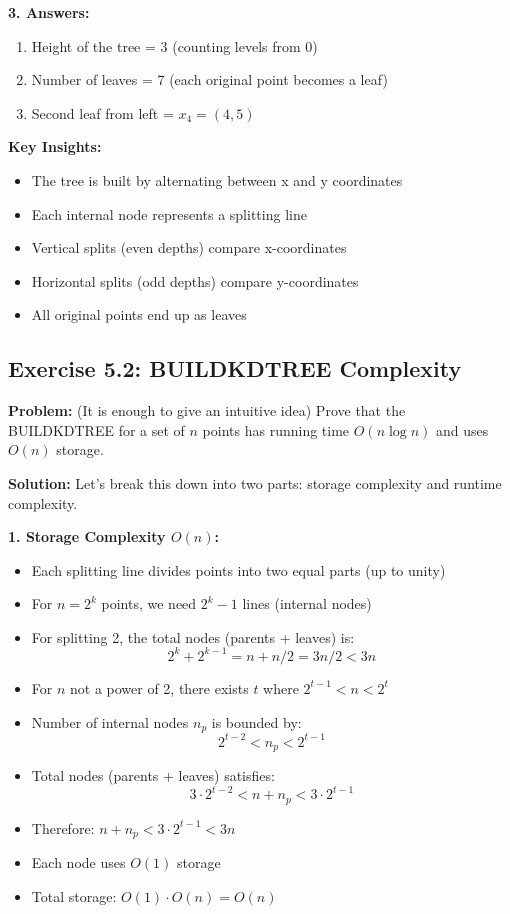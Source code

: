 \textbf{3. Answers:}
\begin{enumerate}[noitemsep]
    \item Height of the tree = 3 (counting levels from 0)
    \item Number of leaves = 7 (each original point becomes a leaf)
    \item Second leaf from left = $x_4 = (4,5)$
\end{enumerate}

\textbf{Key Insights:}
\begin{itemize}[noitemsep]
    \item The tree is built by alternating between x and y coordinates
    \item Each internal node represents a splitting line
    \item Vertical splits (even depths) compare x-coordinates
    \item Horizontal splits (odd depths) compare y-coordinates
    \item All original points end up as leaves
\end{itemize}

\subsection{Exercise 5.2: BUILDKDTREE Complexity}
\textbf{Problem:} (It is enough to give an intuitive idea) Prove that the BUILDKDTREE for a set of $n$ points has running time $O(n \log n)$ and uses $O(n)$ storage.

\textbf{Solution:} Let's break this down into two parts: storage complexity and runtime complexity.

\textbf{1. Storage Complexity $O(n)$:}
\begin{itemize}[noitemsep]
    \item Each splitting line divides points into two equal parts (up to unity)
    \item For $n = 2^k$ points, we need $2^k - 1$ lines (internal nodes)
    \item For splitting 2, the total nodes (parents + leaves) is:
        \[ 2^k + 2^{k-1} = n + n/2 = 3n/2 < 3n \]
    \item For $n$ not a power of 2, there exists $t$ where $2^{t-1} < n < 2^t$
    \item Number of internal nodes $n_p$ is bounded by:
        \[ 2^{t-2} < n_p < 2^{t-1} \]
    \item Total nodes (parents + leaves) satisfies:
        \[ 3 \cdot 2^{t-2} < n + n_p < 3 \cdot 2^{t-1} \]
    \item Therefore: $n + n_p < 3 \cdot 2^{t-1} < 3n$
    \item Each node uses $O(1)$ storage
    \item Total storage: $O(1) \cdot O(n) = O(n)$
\end{itemize}

